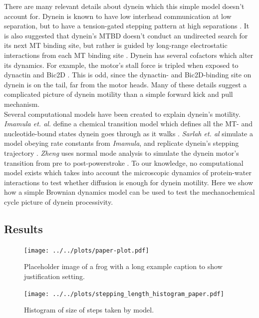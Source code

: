 \documentclass[9pt,twocolumn,twoside,lineno]{pnas-new}
\begin{document}
There are many relevant details about dynein which this simple model doesn't account for. Dynein is known to have low interhead communication at low separation, but to have a tension-gated stepping pattern at high separations \cite{yildizpaper}. It is also suggested that dynein's MTBD doesn't conduct an undirected search for its next MT binding site, but rather is guided by long-range electrostatic interactions from each MT binding site \cite{longrangemt}. Dynein has several cofactors which alter its dynamics. For example, the motor's stall force is tripled when exposed to dynactin and Bic2D \cite{yildizdynactin}. This is odd, since the dynactin- and Bic2D-binding site on dynein is on the tail, far from the motor heads. Many of these details suggest a complicated picture of dynein motility than a simple forward kick and pull mechanism.\\

Several computational models have been created to explain dynein's motility. \textit{Imamula et. al.} define a chemical transition model which defines all the MT- and nucleotide-bound states dynein goes through as it walks \cite{imamulamodel}. \textit{Sarlah et. al} simulate a model obeying rate constants from \textit{Imamula}, and replicate dynein's stepping trajectory \cite{sarlahmodel}. \textit{Zheng} uses normal mode analysis to simulate the dynein motor's transition from pre to post-powerstroke \cite{normalmodes}. To our knowledge, no computational model exists which takes into account the microscopic dynamics of protein-water interactions to test whether diffusion is enough for dynein motility. Here we show how a simple Brownian dynamics model can be used to test the mechanochemical cycle picture of dynein processivity.\\

\subsection*{Results}


\begin{figure}%
\centering
\texttt{[image: ../../plots/paper-plot.pdf]}
\caption{Placeholder image of a frog with a long example caption to show justification setting.}
\label{fig:trajectory}
\end{figure}

\begin{figure}%
\centering
\texttt{[image: ../../plots/stepping\_length\_histogram\_paper.pdf]}
\caption{Histogram of size of steps taken by model.}
\label{fig:lengthhist}
\end{figure}
\end{document}
